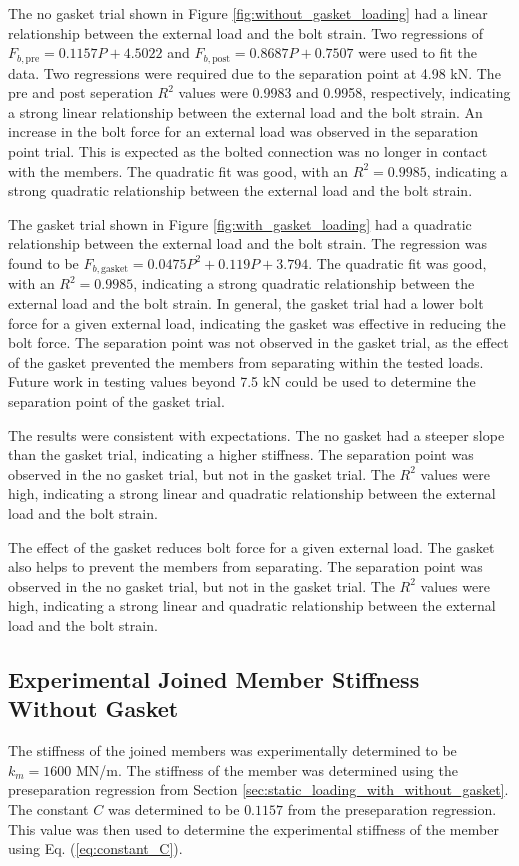 \noindent The no gasket trial shown in Figure \ref{fig:without_gasket_loading} had a linear relationship between the external load and the bolt strain. Two regressions of $F_{b, \text{pre}} = 0.1157 P + 4.5022$ and $F_{b, \text{post}} = 0.8687 P + 0.7507$ were used to fit the data. Two regressions were required due to the separation point at 4.98 kN. The pre and post seperation $R^2$ values were 0.9983 and 0.9958, respectively, indicating a strong linear relationship between the external load and the bolt strain. An increase in the bolt force for an external load was observed in the separation point trial. This is expected as the bolted connection was no longer in contact with the members. The quadratic fit was good, with an $R^2 = 0.9985$, indicating a strong quadratic relationship between the external load and the bolt strain.

The gasket trial shown in Figure \ref{fig:with_gasket_loading} had a quadratic relationship between the external load and the bolt strain. The regression was found to be $F_{b, \text{gasket}} = 0.0475 P^2 + 0.119 P + 3.794$. The quadratic fit was good, with an $R^2 = 0.9985$, indicating a strong quadratic relationship between the external load and the bolt strain. In general, the gasket trial had a lower bolt force for a given external load, indicating the gasket was effective in reducing the bolt force. The separation point was not observed in the gasket trial, as the effect of the gasket prevented the members from separating within the tested loads. Future work in testing values beyond 7.5 kN could be used to determine the separation point of the gasket trial.

The results were consistent with expectations. The no gasket had a steeper slope than the gasket trial, indicating a higher stiffness. The separation point was observed in the no gasket trial, but not in the gasket trial. The $R^2$ values were high, indicating a strong linear and quadratic relationship between the external load and the bolt strain.

The effect of the gasket reduces bolt force for a given external load. The gasket also helps to prevent the members from separating. The separation point was observed in the no gasket trial, but not in the gasket trial. The $R^2$ values were high, indicating a strong linear and quadratic relationship between the external load and the bolt strain. 

\subsection{Experimental Joined Member Stiffness Without Gasket}
The stiffness of the joined members was experimentally determined to be $k_m = 1600$ MN/m. The stiffness of the member was determined using the preseparation  regression from Section \ref{sec:static_loading_with_without_gasket}. The constant $C$ was determined to be $0.1157$ from the preseparation regression. This value was then used to determine the experimental stiffness of the member using Eq. (\ref{eq:constant_C}). 

